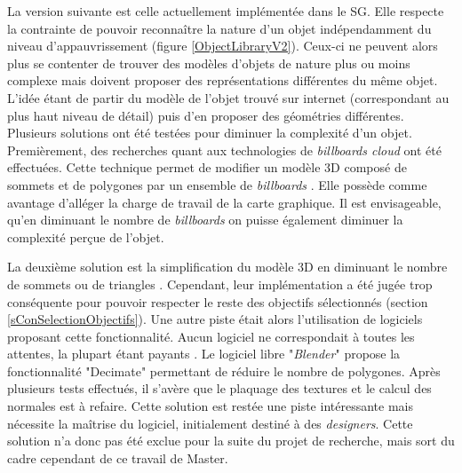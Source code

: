 		La version suivante est celle actuellement implémentée dans le SG. Elle respecte la contrainte de pouvoir reconnaître la nature d'un objet indépendamment du niveau d'appauvrissement (figure \ref{ObjectLibraryV2}). Ceux-ci ne peuvent alors plus se contenter de trouver des modèles d'objets de nature plus ou moins complexe mais doivent proposer des représentations différentes du même objet. L'idée étant de partir du modèle de l'objet trouvé sur internet (correspondant au plus haut niveau de détail) puis d'en proposer des géométries différentes.
		\\
		
		Plusieurs solutions ont été testées pour diminuer la complexité d'un objet. Premièrement, des recherches quant aux technologies de \textit{billboards cloud} ont été effectuées. Cette technique permet de modifier un modèle 3D composé de sommets et de polygones par un ensemble de \textit{billboards} \cite{Decoret_BillboardCloud, Lacewell_BillboardCloud, Behrendt_BillboardCloud, Garcia_BillboardCloud, Decoret_BillboardCloudExtrem}. Elle possède comme avantage d'alléger la charge de travail de la carte graphique. Il est envisageable, qu'en diminuant le nombre de \textit{billboards} on puisse également diminuer la complexité perçue de l'objet.
		
		La deuxième solution est la simplification du modèle 3D en diminuant le nombre de sommets ou de triangles \cite{Schroeder_DecimationTrianglesMeshes}.
		Cependant, leur implémentation a été jugée trop conséquente pour pouvoir respecter le reste des objectifs sélectionnés (section \ref{sConSelectionObjectifs}). Une autre piste était alors l'utilisation de logiciels proposant cette fonctionnalité. Aucun logiciel ne correspondait à toutes les attentes, la plupart étant payants \cite{Atangeo_webiste, Cruncher_UnityPlugin_website}. Le logiciel libre "\textit{Blender}" \cite{Blender_website} propose la fonctionnalité "Decimate" permettant de réduire le nombre de polygones. Après plusieurs tests effectués, il s'avère que le plaquage des textures et le calcul des normales est à refaire. Cette solution est restée une piste intéressante mais nécessite la maîtrise du logiciel, initialement destiné à des \textit{designers}. Cette solution n'a donc pas été exclue pour la suite du projet de recherche, mais sort du cadre cependant de ce travail de Master.
		\\
		
